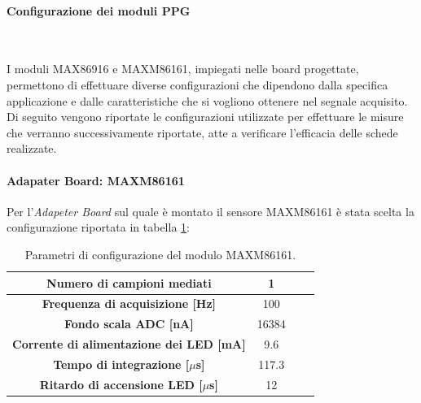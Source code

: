 \paragraph{Configurazione dei moduli PPG}~


\noindent I moduli MAX86916 e MAXM86161, impiegati nelle board progettate, permettono di effettuare diverse configurazioni che dipendono dalla specifica applicazione e dalle caratteristiche che si vogliono ottenere nel segnale acquisito. Di seguito vengono riportate le configurazioni utilizzate per effettuare le misure che verranno successivamente riportate, atte a verificare l'efficacia delle schede realizzate.

\paragraph{Adapater Board: MAXM86161}
Per l'\textit{Adapeter Board} sul quale è montato il sensore MAXM86161 è stata scelta la configurazione riportata in tabella \ref{tab:ConfigMAXM86161}:
\begin{table}[h]
	\renewcommand{\arraystretch}{1.5}
	\centering
	\footnotesize
	\begin{tabular}{cccc}
		\textbf{Numero di campioni mediati} & 1 \\ \hline
		\textbf{Frequenza di acquisizione [Hz]} & 100 \\ \hline
		\textbf{Fondo scala ADC [nA]} & 16384 \\ \hline
		\textbf{Corrente di alimentazione dei LED [mA]} & 9.6 \\ \hline
		\textbf{Tempo di integrazione [$\mu$s]} & 117.3 \\ \hline
		\textbf{Ritardo di accensione LED [$\mu$s]} & 12 \\ \hline
	\end{tabular}
	\caption{Parametri di configurazione del modulo MAXM86161.}
	\label{tab:ConfigMAXM86161}
\end{table}
